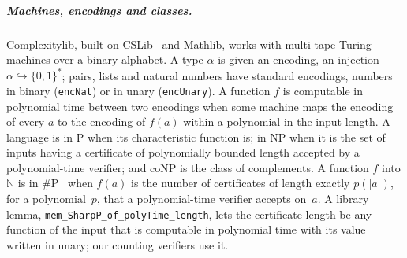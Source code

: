 \documentclass[pdflatex,sn-mathphys-num]{sn-jnl}
\theoremstyle{thmstyleone}
\theoremstyle{thmstylethree}
\begin{document}
\subparagraph*{Machines, encodings and classes.}
Complexitylib, built on CSLib~\cite{CSLib2026} and Mathlib, works with multi-tape Turing
machines over a binary alphabet. A type $\alpha$ is
given an encoding, an injection $\alpha \hookrightarrow \{0,1\}^*$; pairs, lists and natural
numbers have standard encodings, numbers in binary (\lstinline{encNat}) or in unary
(\lstinline{encUnary}). A function $f$ is computable in polynomial time between two encodings
when some machine maps the encoding of every $a$ to the encoding of $f(a)$ within a polynomial
in the input length. A language is in P when its characteristic function is; in NP when it is
the set of inputs having a certificate of polynomially bounded length accepted by a
polynomial-time verifier; and coNP is the class of complements. A function $f$ into
$\mathbb{N}$ is in \#P~\cite{Valiant1979permanent} when $f(a)$ is the number of certificates of length exactly $p(|a|)$,
for a polynomial~$p$, that a polynomial-time verifier accepts on~$a$. A library lemma,
\lstinline{mem_SharpP_of_polyTime_length}, lets the certificate length be any function of the input that is computable in polynomial
time with its value written in unary; our counting verifiers use it.
\end{document}
